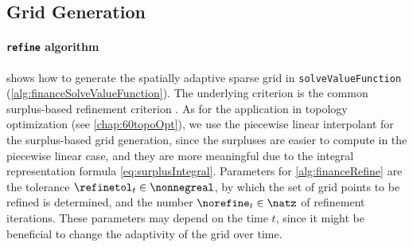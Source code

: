 \subsection{Grid Generation}
\label{sec:826gridGeneration}

\paragraph{\texttt{refine} algorithm}

 shows how to generate the spatially adaptive
sparse grid in \texttt{solveValueFunction}
(\cref{alg:financeSolveValueFunction}).
The underlying criterion is the common surplus-based refinement criterion
\cite{Pflueger13Spatially}.
As for the application in topology optimization (see \cref{chap:60topoOpt}),
we use the piecewise linear interpolant for the surplus-based
grid generation,
since the surpluses are easier to compute in the piecewise linear case,
and they are more meaningful
due to the integral representation formula \eqref{eq:surplusIntegral}.
Parameters for \cref{alg:financeRefine} are
the tolerance $\refinetol_t \in \nonnegreal$,
by which the set of grid points to be refined is determined, and
the number $\norefine_t \in \natz$ of refinement iterations.
These parameters may depend on the time $t$,
since it might be beneficial to change the adaptivity of the
grid over time.

\begin{algorithm}
  \begin{algorithmic}[1]
      \EndFor{}
    \EndFunction{}
  \end{algorithmic}
  \caption[Refinement of the value function (\texttt{refine})]{%
    In-place refinement of the value function $\valueintp[1]_t$.
    Inputs are
    the time $t$,
    the piecewise linear interpolant $\valueintp[1]_t$
    of the current iteration $t$, and
    the higher-order B-spline interpolant $\valueintp[p]_{t+1}$
    of the previous iteration $t + 1$
    (not used if $t = T$).
    The output is the updated piecewise linear interpolant $\valueintp[1]_t$
    with the refined sparse grid.%
  }%
  \label{alg:financeRefine}%
\end{algorithm}

